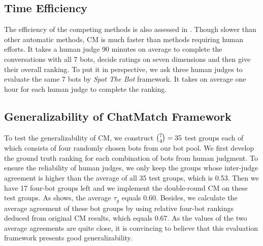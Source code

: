 \subsection{Time Efficiency}
\label{sec:time}
The efficiency of the competing methods is also assessed in . 
Though slower than other automatic methods,
CM is much faster than methods requiring human efforts. 
It takes a human judge 90 minutes on average to complete
the conversations with all 7 bots, decide ratings on seven dimensions and 
then give their overall ranking.
To put it in perspective, we ask three human judges to evaluate the same
7 bots by \textit{Spot The Bot} framework. It takes on average one hour for
each human judge to complete the ranking.


\subsection{Generalizability of ChatMatch Framework}
\label{sec:four}
To test the generalizability of CM,
we construct $\tbinom{7}{4} = 35$ test groups each of which consists of four randomly
chosen bots from our bot pool. 
We first develop the ground truth ranking for each combination 
of bots from human judgment. 
To ensure the reliability of human judges,
we only keep the groups whose inter-judge agreement is 
higher than the average of all 35 test groups, which is 
0.53.
Then we have 17 four-bot groups left
and we implement the double-round CM on
these test groups.
As  shows,
 the average $\tau_g$ equals
0.60. 
Besides, we calculate the average agreement
 of these bot groups by using relative four-bot rankings deduced from original CM 
results, which equals 0.67.
As the values of the two average agreements are quite close, 
it is convincing to believe that this evaluation framework
presents good  generalizability.
   
